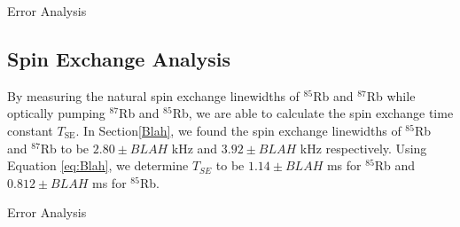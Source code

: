 Error Analysis


\subsection{Spin Exchange Analysis}

By measuring the natural spin exchange linewidths of $^{85}$Rb and $^{87}$Rb while optically pumping $^{87}$Rb and $^{85}$Rb, we are able to calculate the spin exchange time constant $T_{\mathrm{SE}}$.  In Section\ref{Blah}, we found the spin exchange linewidths of $^{85}$Rb and $^{87}$Rb to be $2.80 \pm BLAH$ kHz and $3.92 \pm BLAH$ kHz respectively.  Using Equation \ref{eq:Blah}, we determine $T_{SE}$ to be $1.14 \pm BLAH$ ms for  $^{85}$Rb and $0.812 \pm BLAH$ ms for  $^{85}$Rb. 


Error Analysis
